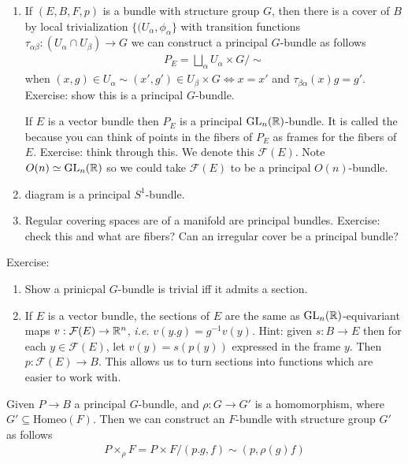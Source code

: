 \documentclass[12pt,class=article,crop=false]{standalone}
\begin{document}
\begin{eg}
\begin{enumerate}[label=(\arabic*)]
	\item If $ (E,B,F,p)$ is a bundle with structure group  $ G$, then there is a cover of  $ B$ by local trivialization  $ \{(U_{ \alpha}, \phi_{ \alpha}\} $ with transition functions $ \tau_{ \alpha \beta} : (U_{ \alpha} \cap U_{ \beta}) \to G$ we can construct a principal $ G$-bundle as follows
		 \begin{align*}
			P_E = \bigsqcup_{ \alpha} U_{ \alpha} \times G / \sim
		\end{align*}
		when $ (x,g) \in U_{ \alpha} \sim (x',g') \in U_{ \beta} \times G \iff x=x'$ and $ \tau_{ \beta \alpha}(x) g= g'$. Exercise: show this is a principal $ G$-bundle.

		If $ E$ is a vector bundle then  $ P_E$ is a principal  $ \text{GL}_{ n}( \mathbb{R}) $-bundle. It is called the  because you can think of points in the fibers of $ P_E$ as frames for the fibers of  $ E$. Exercise: think through this. We denote this $ \mathcal{ F}(E)$. Note $O(n) \simeq \text{GL}_{ n}(\mathbb{R}) $ so we could take $ \mathcal{ F}(E)$ to be a principal $ O(n)$-bundle.
	\item diagram is a principal  $ S^{1}$-bundle.
	\item Regular covering spaces are of a manifold are principal bundles. Exercise: check this and what are fibers? Can an irregular cover be a principal bundle?
\end{enumerate}
\end{eg}

Exercise:
\begin{enumerate}[label=(\arabic*)]
	\item Show a prinicpal $ G$-bundle is trivial iff it admits a section.
	\item If  $ E$ is a vector bundle, the sections of  $ E$ are the same as  $ \text{GL}_{ n}(\mathbb{R}) $-equivariant maps $ v: \mathcal{ F}(E) \to \mathbb{R}^{n}$, \emph{i.e.} $ v(y.g) = g^{-1} v(y)$. Hint: given $ s: B \to E$ then for each $ y \in \mathcal{ F}(E)$, let $ v(y) = s(p(y))$ expressed in the frame  $ y$. Then $ p: \mathcal{ F}(E) \to B$. This allows us to turn sections into functions which are easier to work with.
\end{enumerate}

Given $ P \to B$ a principal $ G$-bundle, and  $ \rho: G \to G'$ is a homomorphism, where $ G' \subseteq \text{Homeo}( F) $. Then we can construct an $ F$-bundle with structure group  $ G'$ as follows
 \begin{align*}
	P \times _{\rho} F = P \times F / (p.g, f) \sim (p,\rho(g)f)
\end{align*}
\end{document}
